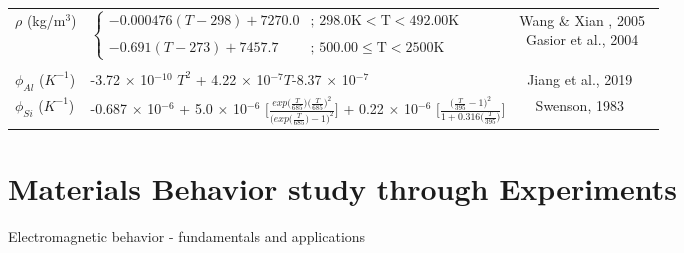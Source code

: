\documentclass[a4paper,fleqn]{cas-sc}
\begin{document}
\begin{table}
\begin{tabular*}{\textwidth}{@{\extracolsep{\fill}} llc}
    \\ 
    $\rho$ (kg/m$^3$)  & $ \begin{cases} 
    -0.000476 (T-298) + 7270.0  & \text{; } \mathrm{298.0 K <  T < 492.00 K} \\
    \\
    -0.691 (T-273) + 7457.7 & \text{; } \mathrm{500.00 \leq T < 2500 K}
    \end{cases}$ &  \makecell[l]{Wang \& Xian , 2005~\cite{Wang2005-JEM} \\ Gasior et al., 2004~\cite{Gasior2004-JPED}} \\
 \\
$\phi_{Al}$ ($K^{-1}$) & -3.72 $\times$ 10$^{-10}$ $T^2$ + 4.22 $\times$ 10$^{-7} T $-8.37 $\times$ 10$^{-7}$  & Jiang et al., 2019 ~\cite{Jiang_2019}   \\
 $\phi_{Si}$ ($K^{-1}$) & -0.687 $\times$ 10$^{-6}$ + 5.0 $\times$ 10$^{-6}$ $ \Big [ \frac{exp \Big ( \frac{T}{685} \Big) \Big ( \frac{T}{685}\Big )^2}{\Big(exp \Big(\frac{T}{685} \Big) - 1 \Big)^2} \Big]$ + 0.22 $\times$ 10$^{-6}$ $ \Big[ \frac{ \Big(\frac{T}{ 395} - 1 \Big)^2}{1 + 0.316 \Big(\frac{T}{ 395} \Big)} \Big]$ &  Swenson, 1983 ~\cite{Swenson1983}   \\
\bottomrule
\end{tabular*}
\end{table}
\section{Materials Behavior study through Experiments} \label{electromagnetic_behavior}
Electromagnetic behavior - fundamentals and applications
\end{document}
